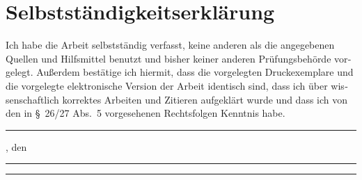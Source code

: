 \chapter*{Selbstständigkeitserklärung}\thispagestyle{empty}
\foreignlanguage{ngerman}{%
Ich habe die Arbeit selbstständig verfasst, keine anderen als die angegebenen
Quellen und Hilfsmittel benutzt und bisher keiner anderen Prüfungsbehörde
vorgelegt. Außerdem bestätige ich hiermit, dass die vorgelegten Druckexemplare
und die vorgelegte elektronische Version der Arbeit identisch sind, dass ich
über wissenschaftlich korrektes Arbeiten und Zitieren aufgeklärt wurde und dass
ich von den in \S~26/27 Abs.~5 vorgesehenen Rechtsfolgen Kenntnis habe.%
}

\vspace{2cm}
\noindent
\rule{3.5cm}{0.4pt}, den \rule{2.5cm}{0.4pt} \hfill \rule{5cm}{0.4pt}

